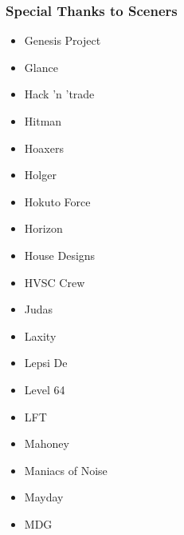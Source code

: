\begin{frame}
\frametitle{Special Thanks to Sceners}

\begin{multicols}{3}
\begin{itemize}
\item Genesis Project
\item Glance
\item Hack 'n 'trade
\item Hitman
\item Hoaxers
\item Holger
\item Hokuto Force
\item Horizon
\item House Designs
\item HVSC Crew
\item Judas
\item Laxity
\item Lepsi De
\item Level 64
\item LFT
\item Mahoney
\item Maniacs of Noise
\item Mayday
\item MDG
\end{itemize}
\end{multicols}

\end{frame}


